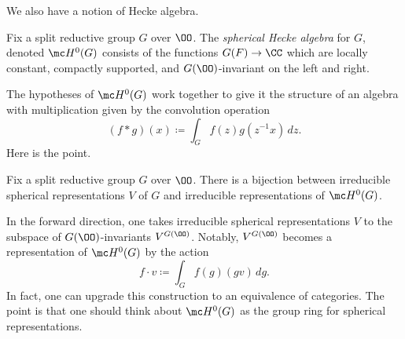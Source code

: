 \documentclass{article}
\begin{document}
We also have a notion of Hecke algebra.
\begin{definition}
	Fix a split reductive group $G$ over $\OO$. The \textit{spherical Hecke algebra} for $G$, denoted $\mc H^0(G)$ consists of the functions $G(F)\to\CC$ which are locally constant, compactly supported, and $G(\OO)$-invariant on the left and right.
\end{definition}
The hypotheses of $\mc H^0(G)$ work together to give it the structure of an algebra with multiplication given by the convolution operation
\[(f*g)(x)\coloneqq\int_Gf(z)g\left(z^{-1}x\right)\,dz.\]
Here is the point.
\begin{theorem}
	Fix a split reductive group $G$ over $\OO$. There is a bijection between irreducible spherical representations $V$ of $G$ and irreducible representations of $\mc H^0(G)$.
\end{theorem}
In the forward direction, one takes irreducible spherical representations $V$ to the subspace of $G(\OO)$-invar\-iants $V^{G(\OO)}$. Notably, $V^{G(\OO)}$ becomes a representation of $\mc H^0(G)$ by the action
\[f\cdot v\coloneqq\int_Gf(g)(gv)\,dg.\]
In fact, one can upgrade this construction to an equivalence of categories. The point is that one should think about $\mc H^0(G)$ as the group ring for spherical representations.
\end{document}
